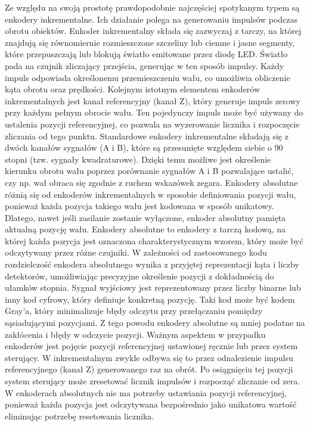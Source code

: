 \noindent Ze względu na swoją prostotę prawdopodobnie najczęściej spotykanym typem są enkodery inkrementalne. Ich działanie polega na generowaniu impulsów podczas obrotu obiektów. Enkoder inkrementalny składa się zazwyczaj z tarczy, na której znajdują się równomiernie rozmieszczone szczeliny lub ciemne i jasne segmenty, które przepuszczają lub blokują światło emitowane przez diodę LED. Światło pada na czujnik zliczający przejścia, generując w ten sposób impulsy. Każdy impuls odpowiada określonemu przemieszczeniu wału, co umożliwia obliczenie kąta obrotu oraz prędkości. Kolejnym istotnym elementem enkoderów inkrementalnych jest kanał referencyjny (kanał Z), który generuje impuls zerowy przy każdym pełnym obrocie wału. Ten pojedynczy impuls może być używany do ustalenia pozycji referencyjnej, co pozwala na wyzerowanie licznika i rozpoczęcie zliczania od tego punktu. Standardowe enkodery inkrementalne składają się z dwóch kanałów sygnałów (A i B), które są przesunięte względem siebie o 90 stopni (tzw. sygnały kwadraturowe). Dzięki temu możliwe jest określenie kierunku obrotu wału poprzez porównanie sygnałów A i B pozwalające ustalić, czy np. wał obraca się zgodnie z ruchem wskazówek zegara.\newline 
\noindent Enkodery absolutne różnią się od enkoderów inkrementalnych w sposobie definiowania pozycji wału, ponieważ każda pozycja takiego wału jest kodowana w sposób unikatowy. Dlatego, nawet jeśli zasilanie zostanie wyłączone, enkoder absolutny pamięta aktualną pozycję wału. Enkodery absolutne to enkodery z tarczą kodową, na której każda pozycja jest oznaczona charakterystycznym wzorem, który może być odczytywany przez różne czujniki. W zależności od zastosowanego kodu rozdzielczość enkodera absolutnego wynika z przyjętej reprezentacji kąta i liczby detektorów, umożliwiając precyzyjne określenie pozycji z dokładnością do ułamków stopnia. Sygnał wyjściowy jest reprezentowany przez liczby binarne lub inny kod cyfrowy, który definiuje konkretną pozycję. Taki kod może być kodem Gray’a, który minimalizuje błędy odczytu przy przełączaniu pomiędzy sąsiadującymi pozycjami. Z tego powodu enkodery absolutne są mniej podatne na zakłócenia i błędy w odczycie pozycji.\newline 
\noindent Ważnym aspektem w przypadku enkoderów jest pojęcie pozycji referencyjnej ustawionej ręcznie lub przez system sterujący. W inkrementalnym zwykle odbywa się to przez odnalezienie impulsu referencyjnego (kanał Z) generowanego raz na obrót. Po osiągnięciu tej pozycji system sterujący może zresetować licznik impulsów i rozpocząć zliczanie od zera. W enkoderach absolutnych nie ma potrzeby ustawiania pozycji referencyjnej, ponieważ każda pozycja jest odczytywana bezpośrednio jako unikatowa wartość eliminując potrzebę resetowania licznika.

